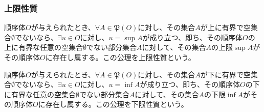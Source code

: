 \documentclass[dvipdfmx]{jsarticle}
\begin{document}
\subsubsection{上限性質}%
\begin{axs}[上限性質]
順序体$O$が与えられたとき、$\forall A \in \mathfrak{P}(O)$に対し、その集合$A$が上に有界で空集合$\emptyset$でないなら、$\exists u \in O$に対し、$u = \sup A$が成り立つ、即ち、その順序体$O$の上に有界な任意の空集合$\emptyset$でない部分集合$A$に対して、その集合$A$の上限$\sup A$がその順序体$O$に存在し属する。この公理を上限性質という。
\end{axs}
\begin{axs}[下限性質]
順序体$O$が与えられたとき、$\forall A \in \mathfrak{P}(O)$に対し、その集合$A$が下に有界で空集合$\emptyset$でないなら、$\exists u \in O$に対し、$u = \inf A$が成り立つ、即ち、その順序体$O$の下に有界な任意の空集合$\emptyset$でない部分集合$A$に対して、その集合$A$の下限$\inf A$がその順序体$O$に存在し属する。この公理を下限性質という。
\end{axs}
\end{document}
